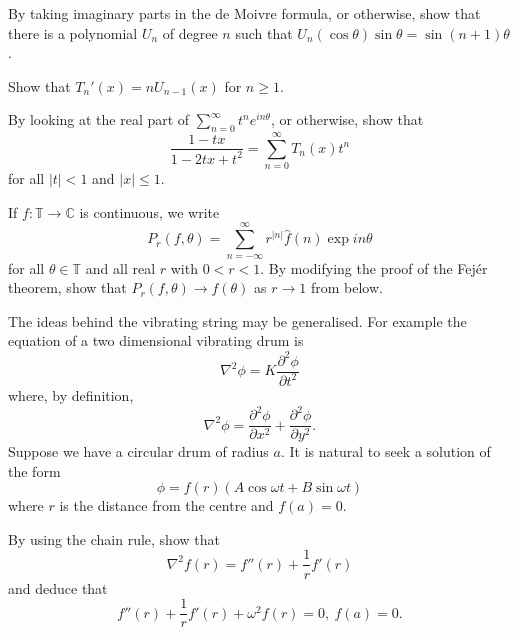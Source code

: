 \begin{question} By taking imaginary parts in the de Moivre formula,
or otherwise,
show that there is a polynomial
$U_{n}$ of degree $n$ such that
$U_{n}(\cos\theta)\sin\theta=\sin(n+1)\theta$.

Show that $T_{n}'(x)=nU_{n-1}(x)$ for $n\geq 1$.
\end{question}
\begin{question} By looking at the real part of
$\sum_{n=0}^{\infty}t^{n}e^{in\theta}$,
or otherwise, show that
\[\frac{1-tx}{1-2tx+t^{2}}=\sum_{n=0}^{\infty}T_{n}(x)t^{n}\]
for all $|t|<1$ and $|x|\leq 1$.
\end{question}

\begin{question} If $f:{\mathbb T}\rightarrow{\mathbb C}$
is continuous, we write
\[P_{r}(f,\theta)=\sum_{n=-\infty}^{\infty}r^{|n|}\hat{f}(n)\exp in\theta\]
for all $\theta\in{\mathbb T}$ and all real $r$ with $0<r<1$.
By modifying the proof of the Fej\'{e}r theorem,
show that $P_{r}(f,\theta)\rightarrow f(\theta)$ as
$r\rightarrow 1$ from below.
\end{question}

\begin{question} The ideas behind the vibrating string
may be generalised. For example the equation of a two
dimensional vibrating drum is
\[\nabla^{2}\phi=K\frac{\partial^{2}\phi}{\partial t^{2}}\]
where, by definition,
\[\nabla^{2}\phi=\frac{\partial^{2}\phi}{\partial x^{2}}
+\frac{\partial^{2}\phi}{\partial y^{2}}.\]
Suppose we have a circular drum of radius $a$.
It is natural to seek a solution of the form
\[\phi=f(r)(A\cos\omega t+B\sin\omega t)\]
where $r$ is the distance from the centre and $f(a)=0$.

By using the chain rule, show that
\[\nabla^{2}f(r)=f''(r)+\frac{1}{r}f'(r)\]
and deduce that
\[f''(r)+\frac{1}{r}f'(r)+\omega^{2}f(r)=0,\ f(a)=0.\]
\end{question}

